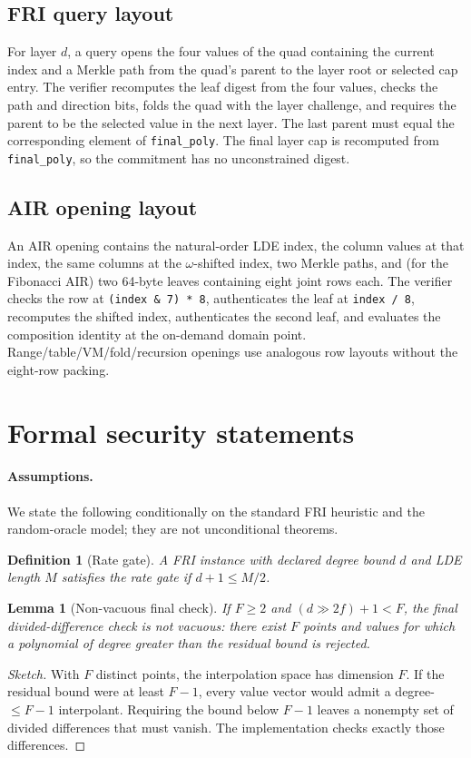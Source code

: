 \documentclass[11pt,a4paper]{article}
\newtheorem{lemma}[theorem]{Lemma}
\newtheorem{definition}[theorem]{Definition}
\begin{document}
\subsection{FRI query layout}

For layer $d$, a query opens the four values of the quad containing the
current index and a Merkle path from the quad's parent to the layer root or
selected cap entry. The verifier recomputes the leaf digest from the four
values, checks the path and direction bits, folds the quad with the layer
challenge, and requires the parent to be the selected value in the next
layer. The last parent must equal the corresponding element of
\texttt{final\_poly}. The final layer cap is recomputed from
\texttt{final\_poly}, so the commitment has no unconstrained digest.

\subsection{AIR opening layout}

An AIR opening contains the natural-order LDE index, the column values at
that index, the same columns at the $\omega$-shifted index, two Merkle paths,
and (for the Fibonacci AIR) two 64-byte leaves containing eight joint rows
each. The verifier checks the row at \texttt{(index \& 7) * 8}, authenticates
the leaf at \texttt{index / 8}, recomputes the shifted index, authenticates
the second leaf, and evaluates the composition identity at the on-demand
domain point. Range/table/VM/fold/recursion openings use analogous row
layouts without the eight-row packing.

\section{Formal security statements}

\paragraph{Assumptions.} We state the following conditionally on the
standard FRI heuristic and the random-oracle model; they are not
unconditional theorems.

\begin{definition}[Rate gate]
A FRI instance with declared degree bound $d$ and LDE length $M$ satisfies
the rate gate if $d+1\le M/2$.
\end{definition}

\begin{lemma}[Non-vacuous final check]
If $F\ge2$ and $(d\gg 2f)+1<F$, the final divided-difference check is not
vacuous: there exist $F$ points and values for which a polynomial of degree
greater than the residual bound is rejected.
\end{lemma}
\begin{proof}[Sketch]
With $F$ distinct points, the interpolation space has dimension $F$. If the
residual bound were at least $F-1$, every value vector would admit a
degree-$\le F-1$ interpolant. Requiring the bound below $F-1$ leaves a
nonempty set of divided differences that must vanish. The implementation
checks exactly those differences.
\end{proof}
\end{document}
